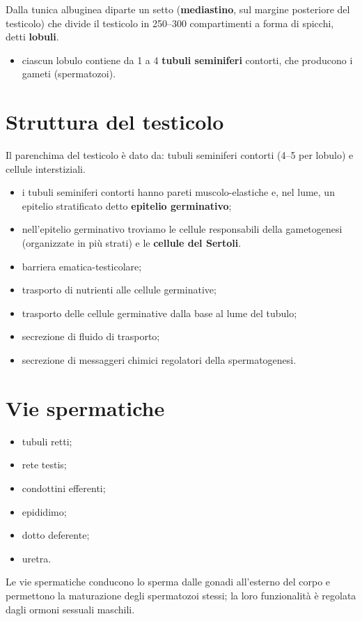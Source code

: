 Dalla tunica albuginea diparte un setto (\textbf{mediastino}, sul margine posteriore del
testicolo) che divide il testicolo in 250--300 compartimenti a forma di spicchi, detti
\textbf{lobuli}.
\begin{itemize}
  \item ciascun lobulo contiene da 1 a 4 \textbf{tubuli seminiferi} contorti, che producono i
    gameti (spermatozoi).
\end{itemize}

\section{Struttura del testicolo}

Il parenchima del testicolo è dato da: tubuli seminiferi contorti (4--5 per lobulo) e cellule
interstiziali.
\begin{itemize}
  \item i tubuli seminiferi contorti hanno pareti muscolo-elastiche e, nel lume, un epitelio
    stratificato detto \textbf{epitelio germinativo};
  \item nell'epitelio germinativo troviamo le cellule responsabili della gametogenesi (organizzate
    in più strati) e le \textbf{cellule del Sertoli}.
\end{itemize}

\begin{itemize}
  \item barriera ematica-testicolare;
  \item trasporto di nutrienti alle cellule germinative;
  \item trasporto delle cellule germinative dalla base al lume del tubulo;
  \item secrezione di fluido di trasporto;
  \item secrezione di messaggeri chimici regolatori della spermatogenesi.
\end{itemize}

\section{Vie spermatiche}

\begin{itemize}
  \item tubuli retti;
  \item rete testis;
  \item condottini efferenti;
  \item epididimo;
  \item dotto deferente;
  \item uretra.
\end{itemize}
Le vie spermatiche conducono lo sperma dalle gonadi all'esterno del corpo e permettono la
maturazione degli spermatozoi stessi; la loro funzionalità è regolata dagli ormoni sessuali
maschili.

